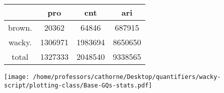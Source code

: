 \documentclass[a4,10pt]{article}
\begin{document}
\begin{sidewaystable}[p]
\tiny{\begin{tabular}{|c|c|c|c|}
 & pro & cnt & ari\\
\hline
brown. & 20362 & 64846 & 687915\\
wacky. & 1306971 & 1983694 & 8650650\\
\hline
total & 1327333 & 2048540 & 9338565
\end{tabular}}
\end{sidewaystable}



\vspace{0.2cm}

\begin{center}
\texttt{[image: /home/professors/cathorne/Desktop/quantifiers/wacky-script/plotting-class/Base-GQs-stats.pdf]}
\end{center}
\end{document}
